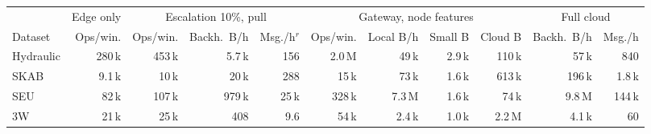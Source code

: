 \begin{tabular}{@{}l r rrr rrrr rr@{}}
\toprule
& Edge only & \multicolumn{3}{c}{Escalation 10\%, pull} & \multicolumn{4}{c}{Gateway, node features} & \multicolumn{2}{c}{Full cloud} \\
\cmidrule(lr){2-2}\cmidrule(lr){3-5}\cmidrule(lr){6-9}\cmidrule(l){10-11}
Dataset & Ops/win. & Ops/win. & Backh.\ B/h & Msg./h$^{r}$ & Ops/win. & Local B/h & Small B & Cloud B & Backh.\ B/h & Msg./h \\
\midrule
Hydraulic & 280\,k & 453\,k & 5.7\,k & 156 & 2.0\,M & 49\,k & 2.9\,k & 110\,k & 57\,k & 840 \\
SKAB & 9.1\,k & 10\,k & 20\,k & 288 & 15\,k & 73\,k & 1.6\,k & 613\,k & 196\,k & 1.8\,k \\
SEU & 82\,k & 107\,k & 979\,k & 25\,k & 328\,k & 7.3\,M & 1.6\,k & 74\,k & 9.8\,M & 144\,k \\
3W & 21\,k & 25\,k & 408 & 9.6 & 54\,k & 2.4\,k & 1.0\,k & 2.2\,M & 4.1\,k & 60 \\
\bottomrule
\end{tabular}
